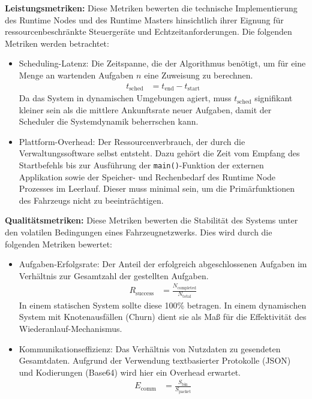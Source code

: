 \textbf{Leistungsmetriken:} Diese Metriken bewerten die technische Implementierung des Runtime Nodes und des Runtime Masters hinsichtlich ihrer Eignung für ressourcenbeschränkte Steuergeräte und Echtzeitanforderungen. Die folgenden Metriken werden betrachtet:

\begin{itemize}
    \item Scheduling-Latenz: Die Zeitspanne, die der Algorithmus benötigt, um für eine Menge an wartenden Aufgaben $n$ eine Zuweisung zu berechnen.
    \begin{align}
    t_{\text{sched}} &= t_{\text{end}} - t_{\text{start}}
    \label{eq:latency}
    \end{align}
    Da das System in dynamischen Umgebungen agiert, muss $t_{\text{sched}}$ signifikant kleiner sein als die mittlere Ankunftsrate neuer Aufgaben, damit der Scheduler die Systemdynamik beherrschen kann.
    \item Plattform-Overhead: Der Ressourcenverbrauch, der durch die Verwaltungssoftware selbst entsteht. Dazu gehört die Zeit vom Empfang des Startbefehls bis zur Ausführung der \texttt{main()}-Funktion der externen Applikation sowie der Speicher- und Rechenbedarf des Runtime Node Prozesses im Leerlauf. Dieser muss minimal sein, um die Primärfunktionen des Fahrzeugs nicht zu beeinträchtigen.
\end{itemize}

\textbf{Qualitätsmetriken:} Diese Metriken bewerten die Stabilität des Systems unter den volatilen Bedingungen eines Fahrzeugnetzwerks. Dies wird durch die folgenden Metriken bewertet:

\begin{itemize}
    \item Aufgaben-Erfolgsrate: Der Anteil der erfolgreich abgeschlossenen Aufgaben im Verhältnis zur Gesamtzahl der gestellten Aufgaben.
    \begin{align}
    R_{\text{success}} &= \frac{N_{\text{completed}}}{N_{\text{total}}}
    \label{eq:success_rate}
    \end{align}
    In einem statischen System sollte diese 100\% betragen. In einem dynamischen System mit Knotenausfällen (Churn) dient sie als Maß für die Effektivität des Wiederanlauf-Mechanismus.
    \item Kommunikationseffizienz: Das Verhältnis von Nutzdaten zu gesendeten Gesamtdaten. Aufgrund der Verwendung textbasierter Protokolle (JSON) und Kodierungen (Base64) wird hier ein Overhead erwartet.
    \begin{align}
    E_{\text{comm}} &= \frac{S_{\text{bin}}}{S_{\text{packet}}}
    \label{eq:comm_efficiency}
    \end{align}
\end{itemize}

